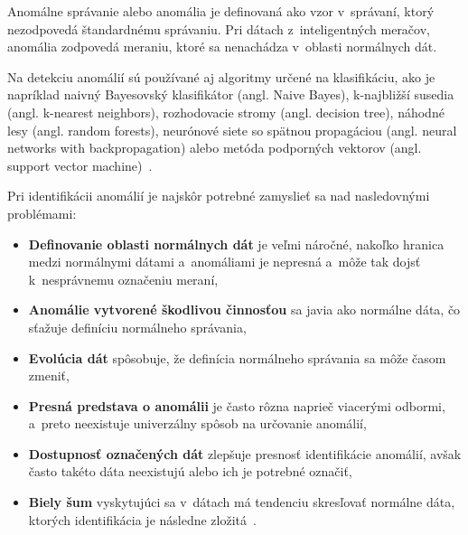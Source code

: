 \documentclass[a4paper,twoside,slovak,12pt]{article}
\begin{document}
Anomálne správanie alebo anomália je definovaná ako vzor v~správaní, ktorý
nezodpovedá štandardnému správaniu. Pri dátach z~inteligentných meračov, anomália
zodpovedá meraniu, ktoré sa nenachádza v~oblasti normálnych dát.

Na detekciu anomálií sú používané aj algoritmy určené na klasifikáciu, ako je
napríklad naivný Bayesovský klasifikátor (angl. Naive Bayes), k-najbližší
susedia (angl. k-nearest neighbors), rozhodovacie stromy (angl. decision tree),
náhodné lesy (angl. random forests), neurónové siete so spätnou propagáciou
(angl. neural networks with backpropagation) alebo metóda podporných vektorov
(angl. support vector machine)~\cite{Coma-Puig2016}.


Pri identifikácii anomálií je najskôr potrebné zamyslieť sa nad nasledovnými
problémami:

\begin{itemize}[noitemsep]
\item \textbf{Definovanie oblasti normálnych dát} je veľmi náročné, nakoľko
hranica medzi normálnymi dátami a~anomáliami je nepresná a~môže tak dojsť
k~nesprávnemu označeniu meraní,
\item \textbf{Anomálie vytvorené škodlivou činnosťou} sa javia ako normálne dáta,
čo sťažuje definíciu normálneho správania,
\item \textbf{Evolúcia dát} spôsobuje, že definícia normálneho správania sa môže
časom zmeniť,
\item \textbf{Presná predstava o anomálii} je často rôzna naprieč viacerými
odbormi, a~preto neexistuje univerzálny spôsob na určovanie anomálií,
\item \textbf{Dostupnosť označených dát} zlepšuje presnosť identifikácie anomálií,
avšak často takéto dáta neexistujú alebo ich je potrebné označiť,
\item \textbf{Biely šum} vyskytujúci sa v~dátach má tendenciu skresľovať
normálne dáta, ktorých identifikácia je následne zložitá~\cite{Chandola2009}.
\end{itemize}
\end{document}
